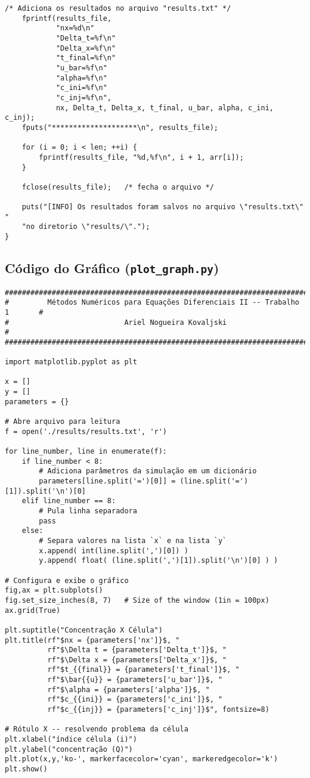 \begin{Verbatim}[fontsize=\footnotesize]
    /* Adiciona os resultados no arquivo "results.txt" */
    fprintf(results_file,
            "nx=%d\n"
            "Delta_t=%f\n"
            "Delta_x=%f\n"
            "t_final=%f\n"
            "u_bar=%f\n"
            "alpha=%f\n"
            "c_ini=%f\n"
            "c_inj=%f\n",
            nx, Delta_t, Delta_x, t_final, u_bar, alpha, c_ini, c_inj);
    fputs("********************\n", results_file);

    for (i = 0; i < len; ++i) {
        fprintf(results_file, "%d,%f\n", i + 1, arr[i]);
    }

    fclose(results_file);   /* fecha o arquivo */

    puts("[INFO] Os resultados foram salvos no arquivo \"results.txt\" "
    "no diretorio \"results/\".");
}
\end{Verbatim}

\subsection{Código do Gráfico (\texttt{plot\_graph.py})}

\begin{Verbatim}[fontsize=\footnotesize]
###############################################################################
#         Métodos Numéricos para Equações Diferenciais II -- Trabalho 1       #
#                           Ariel Nogueira Kovaljski                          #
###############################################################################

import matplotlib.pyplot as plt

x = []
y = []
parameters = {}

# Abre arquivo para leitura
f = open('./results/results.txt', 'r')

for line_number, line in enumerate(f):
    if line_number < 8:
        # Adiciona parâmetros da simulação em um dicionário
        parameters[line.split('=')[0]] = (line.split('=')[1]).split('\n')[0]
    elif line_number == 8:
        # Pula linha separadora
        pass
    else:
        # Separa valores na lista `x` e na lista `y`
        x.append( int(line.split(',')[0]) )
        y.append( float( (line.split(',')[1]).split('\n')[0] ) )

# Configura e exibe o gráfico
fig,ax = plt.subplots()
fig.set_size_inches(8, 7)   # Size of the window (1in = 100px)
ax.grid(True)

plt.suptitle("Concentração X Célula")
plt.title(rf"$nx = {parameters['nx']}$, "
          rf"$\Delta t = {parameters['Delta_t']}$, "
          rf"$\Delta x = {parameters['Delta_x']}$, "
          rf"$t_{{final}} = {parameters['t_final']}$, "
          rf"$\bar{{u}} = {parameters['u_bar']}$, "
          rf"$\alpha = {parameters['alpha']}$, "
          rf"$c_{{ini}} = {parameters['c_ini']}$, "
          rf"$c_{{inj}} = {parameters['c_inj']}$", fontsize=8)

# Rótulo X -- resolvendo problema da célula
plt.xlabel("índice célula (i)")
plt.ylabel("concentração (Q)")
plt.plot(x,y,'ko-', markerfacecolor='cyan', markeredgecolor='k')
plt.show()
\end{Verbatim}
